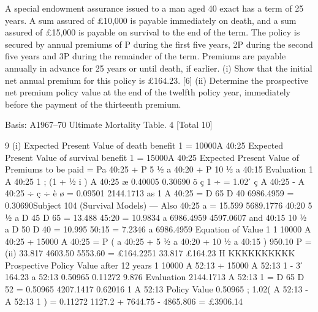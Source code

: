 \documentclass[a4paper,12pt]{article}
\begin{document}

A special endowment assurance issued to a man aged 40 exact has a term of 25
years. A sum assured of £10,000 is payable immediately on death, and a sum
assured of £15,000 is payable on survival to the end of the term.
The policy is secured by annual premiums of P during the first five years, 2P
during the second five years and 3P during the remainder of the term.
Premiums are payable annually in advance for 25 years or until death, if
earlier.
(i) Show that the initial net annual premium for this policy is £164.23.
[6]
(ii) Determine the prospective net premium policy value at the end of the
twelfth policy year, immediately before the payment of the thirteenth
premium.

Basis: A1967–70 Ultimate Mortality Table. 4%
[Total 10]



9
(i)
Expected Present Value of death benefit 1
= 10000A 40:25
Expected Present Value of survival benefit 1
= 15000A 40:25
Expected Present Value of Premiums to be paid
= Pa 40:25 + P 5 1⁄2 a 40:20 + P 10 1⁄2 a 40:15
Evaluation
1
A 40:25
1
; (1 + 1⁄2 i ) A 40:25
æ 0.40005 0.30690 ö
ç
1 ÷
= 1.02  ́ ç A 40:25 - A 40:25
÷
ç
÷
è
ø
= 0.09501
2144.1713
as
1
A 40:25
=
D 65
D 40
6986.4959
= 0.30690Subject 104 (Survival Models) — %
Also
40:25
a
= 15.599
5689.1776
40:20
5 1⁄2 a
D 45
D 65
=
13.488
45:20 = 10.9834
a
6986.4959
4597.0607
and
40:15
10 1⁄2 a
D 50
D 40
=
10.995
50:15 = 7.2346
a
6986.4959
Equation of Value
1
1
10000 A 40:25
+ 15000 A 40:25
= P ( a 40:25 + 5 1⁄2 a 40:20 + 10 1⁄2 a 40:15 )
950.10
P =
(ii)
33.817
4603.50
5553.60
= £164.2251
33.817
£164.23 H
KKKKKKKKKK
Prospective Policy Value after 12 years
1
10000 A 52:13
+ 15000 A 52:13 1 - 3  ́ 164.23 a 52:13
0.50965
0.11272
9.876
Evaluation
2144.1713
A 52:13 1 =
D 65
D 52
= 0.50965
4207.1417
0.62016
1
A 52:13
Policy Value
0.50965
; 1.02( A 52:13 - A 52:13 1 ) = 0.11272
1127.2 + 7644.75 - 4865.806 = £3906.14
\end{document}

